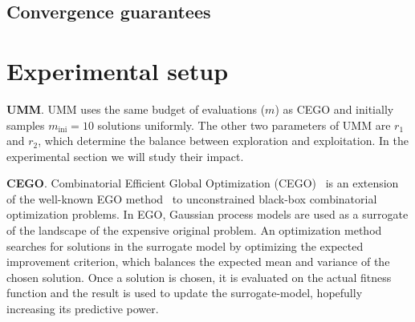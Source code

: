 \documentclass[sigconf,dvipsnames]{acmart}
\newcommand{\minit}{\ensuremath{m_\text{ini}}\xspace}
\newcommand{\FEmax}{\ensuremath{m}}
\begin{document}

\subsection{Convergence guarantees}

\renewcommand{\subsubsection}[1]{\smallskip{}\noindent\textbf{#1}.}


\section{Experimental setup}\label{sec:setup}

\subsubsection{UMM}
%
UMM uses the same budget of evaluations ($\FEmax$) as CEGO and initially
samples $\minit=10$ solutions uniformly.
The other two parameters of UMM are $r_1$ and $r_2$, which determine the
balance between exploration and exploitation. In the experimental section we
will study their impact.

\subsubsection{CEGO} 
Combinatorial Efficient Global Optimization (CEGO)~\citep{ZaeStoFriFisNauBar2014} is an extension of the well-known EGO
method~\citep{JonSchWel98go} to unconstrained black-box combinatorial
optimization problems. In EGO, Gaussian process models are used as a surrogate
of the landscape of the expensive original problem. An optimization method
searches for solutions in the surrogate model by optimizing the expected
improvement criterion, which balances the expected mean and variance of the
chosen solution. Once a solution is chosen, it is evaluated on the actual
fitness function and the result is used to update the surrogate-model,
hopefully increasing its predictive power.
\end{document}
